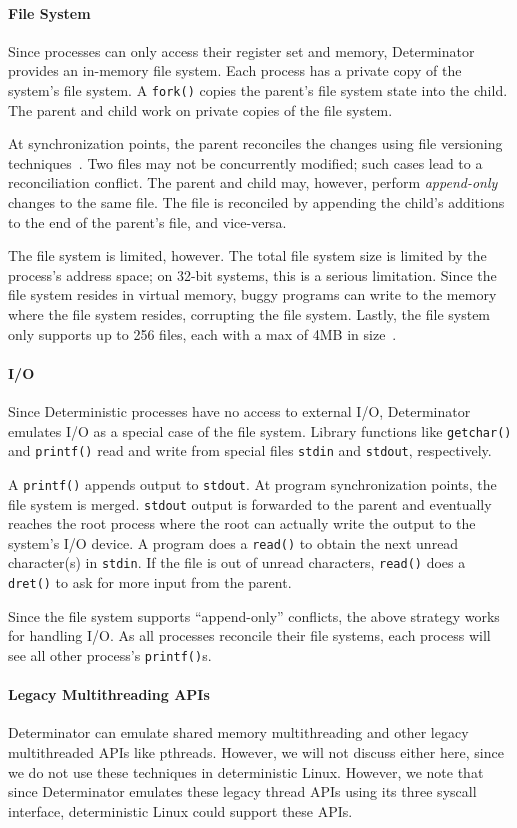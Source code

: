 \paragraph{File System}
Since processes can only access their register set and memory, Determinator
provides an in-memory file system. Each process has a private copy of the
system's file system. A {\tt fork()} copies the parent's file system state into
the child. The parent and child work on private copies of the file system.

At synchronization points, the parent reconciles the changes using file
versioning techniques~\cite{parker1983detection}. Two files may not be
concurrently modified; such cases lead to a reconciliation conflict. The parent
and child may, however, perform \emph{append-only} changes to the same file.
The file is reconciled by appending the child's additions to the end of the
parent's file, and vice-versa.

The file system is limited, however. The total file system size is limited
by the process's address space; on 32-bit systems, this is a serious limitation.
Since the file system resides in virtual memory, buggy programs can write to
the memory where the file system resides, corrupting the file system. Lastly,
the file system only supports up to 256 files, each with a max of 4MB in
size~\cite{Aviram10cloud}.

\paragraph{I/O}
Since Deterministic processes have no access to external I/O, Determinator
emulates I/O as a special case of the file system. Library functions like
{\tt getchar()} and {\tt printf()} read and write from special files
{\tt stdin} and {\tt stdout}, respectively.

A {\tt printf()} appends output to {\tt stdout}. At program synchronization
points, the file system is merged. {\tt stdout} output is forwarded
to the parent and eventually reaches the root process where the root can
actually write the output to the system's I/O device.
A program does a {\tt read()} to obtain the next unread character(s) in
{\tt stdin}. If the file is out of unread characters, {\tt read()} does a
{\tt dret()} to ask for more input from the parent.

Since the file system supports ``append-only'' conflicts, the above strategy
works for handling I/O. As all processes reconcile their file systems, each
process will see all other process's {\tt printf()}s.

\paragraph{Legacy Multithreading APIs}
Determinator can emulate shared memory multithreading and other legacy
multithreaded APIs like pthreads. However, we will not discuss either here,
since we do not use these techniques in deterministic Linux. However, we note
that since Determinator emulates these legacy thread APIs using its three
syscall interface, deterministic Linux could support these APIs.

\endinput

